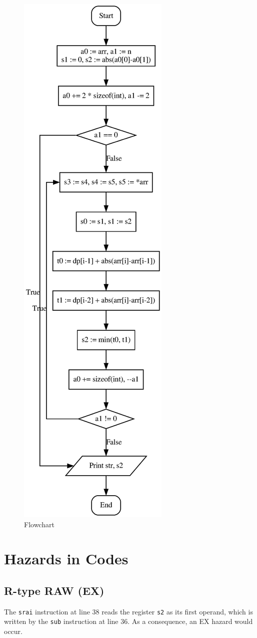 \documentclass[12pt, a4paper]{article}
\begin{document}
\begin{figure}[htbp]
\centering
\includegraphics[width=.4\linewidth]{flowchart}
\caption{Flowchart}
\label{fig:fc}
\end{figure}

\section{Hazards in Codes}

\subsection{R-type RAW (EX)}

The \texttt{srai} instruction at line 38 reads the register \texttt{s2} as its first operand, which is written by the \texttt{sub} instruction at line 36. As a consequence, an EX hazard would occur.
\end{document}
